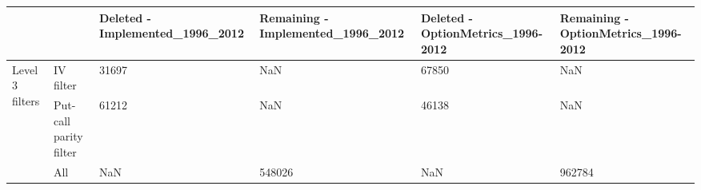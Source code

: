 \begin{tabular}{llllll}
\toprule
 &  & Deleted - Implemented_1996_2012 & Remaining - Implemented_1996_2012 & Deleted - OptionMetrics_1996-2012 & Remaining - OptionMetrics_1996-2012 \\
\midrule
\multirow[t]{3}{*}{Level 3 filters} & IV filter & 31697 & NaN & 67850 & NaN \\
 & Put-call parity filter & 61212 & NaN & 46138 & NaN \\
 & All & NaN & 548026 & NaN & 962784 \\
\cline{1-6}
\bottomrule
\end{tabular}
